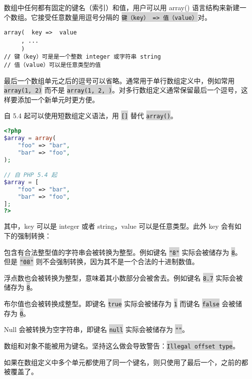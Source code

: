 数组中任何都有固定的键名（索引）和值，用户可以用 array() 语言结构来新建一个数组。它接受任意数量用逗号分隔的 \colorbox{lightgray}{\texttt{键（key） => 值（value）}}对。

\begin{verbatim}
array(  key =>  value
     , ...
     )
// 键（key）可是是一个整数 integer 或字符串 string
// 值（value）可以是任意类型的值
\end{verbatim}

最后一个数组单元之后的逗号可以省略。通常用于单行数组定义中，例如常用 \colorbox{lightgray}{\texttt{array(1, 2)}} 而不是 \colorbox{lightgray}{\texttt{array(1, 2, )}}。对多行数组定义通常保留最后一个逗号，这样要添加一个新单元时更方便。

自 5.4 起可以使用短数组定义语法，用 \colorbox{lightgray}{\texttt{[]}} 替代 \colorbox{lightgray}{\texttt{array()}}。

\begin{lstlisting}[language=PHP]
<?php
$array = array(
    "foo" => "bar",
    "bar" => "foo",
);

// 自 PHP 5.4 起
$array = [
    "foo" => "bar",
    "bar" => "foo",
];
?>
\end{lstlisting}

其中，key 可以是 integer 或者 string，value 可以是任意类型。此外 key 会有如下的强制转换：

\begin{compactitem}
\item 包含有合法整型值的字符串会被转换为整型。例如键名 \colorbox{lightgray}{\texttt{"8"}} 实际会被储存为 \colorbox{lightgray}{\texttt{8}}。但是 \colorbox{lightgray}{\texttt{"08"}} 则不会强制转换，因为其不是一个合法的十进制数值。
\item 浮点数也会被转换为整型，意味着其小数部分会被舍去。例如键名 \colorbox{lightgray}{\texttt{8.7}} 实际会被储存为 \colorbox{lightgray}{\texttt{8}}。
\item 布尔值也会被转换成整型。即键名 \colorbox{lightgray}{\texttt{true}} 实际会被储存为 \colorbox{lightgray}{\texttt{1}} 而键名 \colorbox{lightgray}{\texttt{false}} 会被储存为 \colorbox{lightgray}{\texttt{0}}。
\item Null 会被转换为空字符串，即键名 \colorbox{lightgray}{\texttt{null}} 实际会被储存为 \colorbox{lightgray}{\texttt{""}}。
\item 数组和对象不能被用为键名。坚持这么做会导致警告：\colorbox{lightgray}{\texttt{Illegal offset type}}。
\end{compactitem}

如果在数组定义中多个单元都使用了同一个键名，则只使用了最后一个，之前的都被覆盖了。

